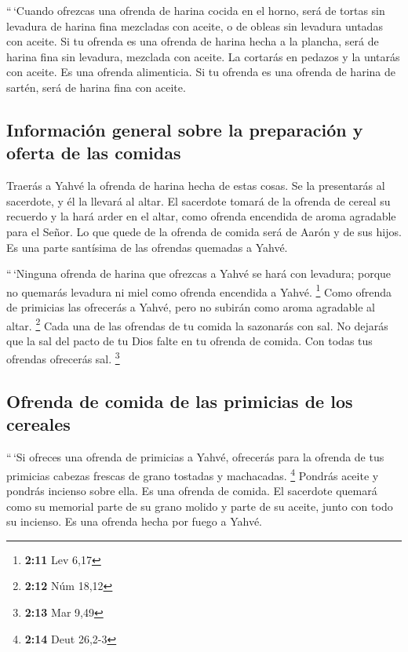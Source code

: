  ``\,`Cuando ofrezcas una ofrenda de harina cocida en el
horno, será de tortas sin levadura de harina fina mezcladas con aceite,
o de obleas sin levadura untadas con aceite.  Si tu
ofrenda es una ofrenda de harina hecha a la plancha, será de harina fina
sin levadura, mezclada con aceite.  La cortarás en pedazos
y la untarás con aceite. Es una ofrenda alimenticia.  Si
tu ofrenda es una ofrenda de harina de sartén, será de harina fina con
aceite.

\hypertarget{informaciuxf3n-general-sobre-la-preparaciuxf3n-y-oferta-de-las-comidas}{%
\subsection{Información general sobre la preparación y oferta de las
comidas}\label{informaciuxf3n-general-sobre-la-preparaciuxf3n-y-oferta-de-las-comidas}}

 Traerás a Yahvé la ofrenda de harina hecha de estas
cosas. Se la presentarás al sacerdote, y él la llevará al altar.
 El sacerdote tomará de la ofrenda de cereal su recuerdo y
la hará arder en el altar, como ofrenda encendida de aroma agradable
para el Señor.  Lo que quede de la ofrenda de comida será
de Aarón y de sus hijos. Es una parte santísima de las ofrendas quemadas
a Yahvé.

 ``\,`Ninguna ofrenda de harina que ofrezcas a Yahvé se
hará con levadura; porque no quemarás levadura ni miel como ofrenda
encendida a Yahvé. \footnote{\textbf{2:11} Lev 6,17} 
Como ofrenda de primicias las ofrecerás a Yahvé, pero no subirán como
aroma agradable al altar. \footnote{\textbf{2:12} Núm 18,12}
 Cada una de las ofrendas de tu comida la sazonarás con
sal. No dejarás que la sal del pacto de tu Dios falte en tu ofrenda de
comida. Con todas tus ofrendas ofrecerás sal. \footnote{\textbf{2:13}
  Mar 9,49}

\hypertarget{ofrenda-de-comida-de-las-primicias-de-los-cereales}{%
\subsection{Ofrenda de comida de las primicias de los
cereales}\label{ofrenda-de-comida-de-las-primicias-de-los-cereales}}

 ``\,`Si ofreces una ofrenda de primicias a Yahvé,
ofrecerás para la ofrenda de tus primicias cabezas frescas de grano
tostadas y machacadas. \footnote{\textbf{2:14} Deut 26,2-3}
 Pondrás aceite y pondrás incienso sobre ella. Es una
ofrenda de comida.  El sacerdote quemará como su memorial
parte de su grano molido y parte de su aceite, junto con todo su
incienso. Es una ofrenda hecha por fuego a Yahvé.

